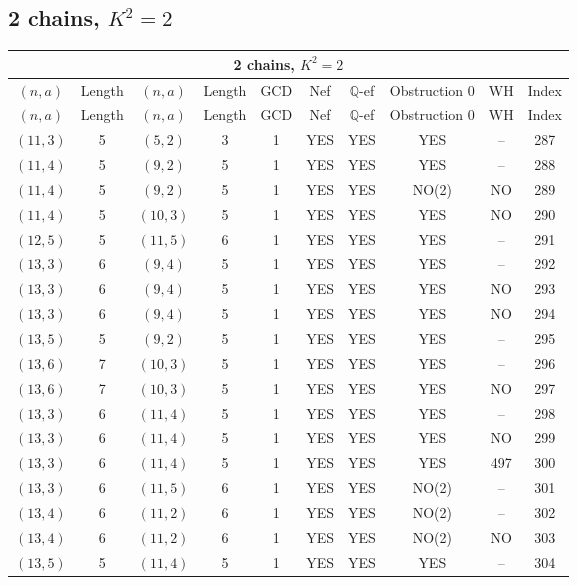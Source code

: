 \subsection{2 chains, $K^2 = 2$}
\begin{longtable}{|c|c|c|c|c|c|c|c|c|c|}
\hline
\multicolumn{10}{|c|}{2 chains, $K^2 = 2$}\\
\hline
$(n,a)$ & Length & $(n,a)$ & Length & GCD & Nef & $\mathbb Q$-ef & Obstruction 0 & WH & Index\\
\hline
\endfirsthead

\hline
$(n,a)$ & Length & $(n,a)$ & Length & GCD & Nef & $\mathbb Q$-ef & Obstruction 0 & WH & Index\\
\hline
\endhead
\hline
\endfoot

$(11, 3)$ & 5 & $(5, 2)$ & 3 & 1 & YES & YES & YES & -- & 287\\
$(11, 4)$ & 5 & $(9, 2)$ & 5 & 1 & YES & YES & YES & -- & 288\\
$(11, 4)$ & 5 & $(9, 2)$ & 5 & 1 & YES & YES & NO(2) & NO & 289\\
$(11, 4)$ & 5 & $(10, 3)$ & 5 & 1 & YES & YES & YES & NO & 290\\
$(12, 5)$ & 5 & $(11, 5)$ & 6 & 1 & YES & YES & YES & -- & 291\\
$(13, 3)$ & 6 & $(9, 4)$ & 5 & 1 & YES & YES & YES & -- & 292\\
$(13, 3)$ & 6 & $(9, 4)$ & 5 & 1 & YES & YES & YES & NO & 293\\
$(13, 3)$ & 6 & $(9, 4)$ & 5 & 1 & YES & YES & YES & NO & 294\\
$(13, 5)$ & 5 & $(9, 2)$ & 5 & 1 & YES & YES & YES & -- & 295\\
$(13, 6)$ & 7 & $(10, 3)$ & 5 & 1 & YES & YES & YES & -- & 296\\
$(13, 6)$ & 7 & $(10, 3)$ & 5 & 1 & YES & YES & YES & NO & 297\\
$(13, 3)$ & 6 & $(11, 4)$ & 5 & 1 & YES & YES & YES & -- & 298\\
$(13, 3)$ & 6 & $(11, 4)$ & 5 & 1 & YES & YES & YES & NO & 299\\
$(13, 3)$ & 6 & $(11, 4)$ & 5 & 1 & YES & YES & YES & 497 & 300\\
$(13, 3)$ & 6 & $(11, 5)$ & 6 & 1 & YES & YES & NO(2) & -- & 301\\
$(13, 4)$ & 6 & $(11, 2)$ & 6 & 1 & YES & YES & NO(2) & -- & 302\\
$(13, 4)$ & 6 & $(11, 2)$ & 6 & 1 & YES & YES & NO(2) & NO & 303\\
$(13, 5)$ & 5 & $(11, 4)$ & 5 & 1 & YES & YES & YES & -- & 304\\

\end{longtable}
